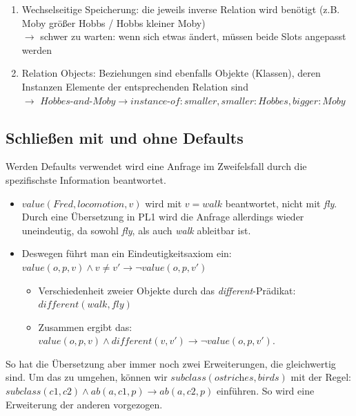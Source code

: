 \documentclass[runningheads,deutsch]{llncs}
\begin{document}
\begin{enumerate}
    \item Wechselseitige Speicherung: die jeweils inverse Relation wird benötigt (z.B. Moby größer Hobbs / Hobbs kleiner Moby) \\
          $\rightarrow$ schwer zu warten: wenn sich etwas ändert, müssen beide Slots angepasst werden
    \item Relation Objects: Beziehungen sind ebenfalls Objekte (Klassen), deren Instanzen Elemente der entsprechenden Relation sind \\
          $\rightarrow$ $\textit{Hobbes-and-Moby} \rightarrow \textit{instance-of}: \textit{smaller}, \textit{smaller}: Hobbes, \textit{bigger}: Moby$
\end{enumerate}

\subsection{Schließen mit und ohne Defaults}

Werden Defaults verwendet wird eine Anfrage im Zweifelsfall durch die spezifischste Information beantwortet.

\begin{itemize}
    \item $\textit{value}(\textit{Fred}, \textit{locomotion}, v)$ wird mit $v = \textit{walk}$ beantwortet, nicht mit \textit{fly}. \\
    Durch eine Übersetzung in PL1 wird die Anfrage allerdings wieder uneindeutig, da sowohl \textit{fly}, als auch \textit{walk} ableitbar ist.
    \item Deswegen führt man ein Eindeutigkeitsaxiom ein: $\textit{value}(o, p, v) \land v \neq v' \rightarrow \lnot \textit{value}(o, p, v')$
    \begin{itemize}
        \item Verschiedenheit zweier Objekte durch das \textit{different}-Prädikat: $\textit{different}(\textit{walk}, \textit{fly})$
        \item Zusammen ergibt das: $\textit{value}(o, p, v) \land \textit{different}(v, v') \rightarrow \lnot \textit{value}(o, p, v')$.
    \end{itemize}
\end{itemize}

So hat die Übersetzung aber immer noch zwei Erweiterungen, die gleichwertig sind. Um das zu umgehen, können wir $\textit{subclass}(\textit{ostriches}, \textit{birds})$ mit der Regel: $\textit{subclass}(c1, c2) \land \textit{ab}(a, c1, p) \rightarrow \textit{ab}(a, c2, p)$ einführen. So wird eine Erweiterung der anderen vorgezogen.
\end{document}
